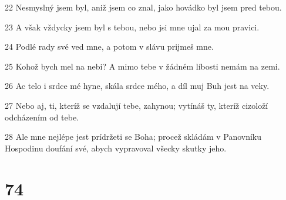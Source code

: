 \par 22 Nesmyslný jsem byl, aniž jsem co znal, jako hovádko byl jsem pred tebou.
\par 23 A však vždycky jsem byl s tebou, nebo jsi mne ujal za mou pravici.
\par 24 Podlé rady své ved mne, a potom v slávu prijmeš mne.
\par 25 Kohož bych mel na nebi? A mimo tebe v žádném líbosti nemám na zemi.
\par 26 Ac telo i srdce mé hyne, skála srdce mého, a díl muj Buh jest na veky.
\par 27 Nebo aj, ti, kteríž se vzdalují tebe, zahynou; vytínáš ty, kteríž cizoloží odcházením od tebe.
\par 28 Ale mne nejlépe jest prídržeti se Boha; procež skládám v Panovníku Hospodinu doufání své, abych vypravoval všecky skutky jeho.

\chapter{74}


